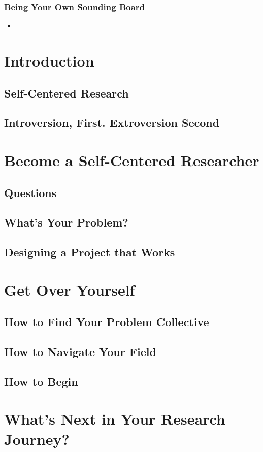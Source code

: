 \documentclass[11pt]{article}
\begin{document}
\subsubsection{Being Your Own Sounding Board}
\begin{itemize}
\item \begin{exercise}
\end{exercise}
\end{itemize}
\newpage
\section{Introduction}
\subsection{Self-Centered Research}
\subsection{Introversion, First. Extroversion Second}


\section{Become a Self-Centered Researcher}
\subsection{Questions}
\subsection{What's Your Problem?}
\subsection{Designing a Project that Works}


\section{Get Over Yourself}
\subsection{How to Find Your Problem Collective}
\subsection{How to Navigate Your Field}
\subsection{How to Begin}

\section{What's Next in Your Research Journey?}


\newpage


\end{document}
